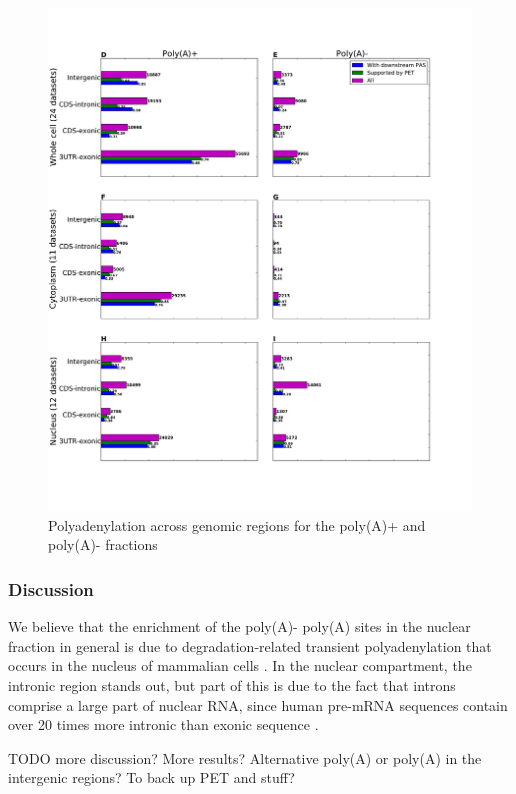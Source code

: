 \begin{figure}[htb]
	\begin{center}
		\includegraphics[scale=0.4]{figures/polyadenylation/Sidebars_pA_2+.pdf}
	\end{center}
	\caption{Polyadenylation across genomic regions for the poly(A)+ and poly(A)-
	fractions}
	\label{fig:sidebars}
\end{figure}

\subsubsection{Discussion}
We believe that the enrichment of the poly(A)- poly(A) sites in the nuclear
fraction in general is due to degradation-related transient polyadenylation
that occurs in the nucleus of mammalian cells \cite{lemay_nuclear_2010,
lacava_rna_2005, wyers_cryptic_2005}. In the nuclear compartment, the intronic
region stands out, but part of this is due to the fact that introns comprise a
large part of nuclear RNA, since human pre-mRNA sequences contain over 20 times
more intronic than exonic sequence \cite{venter_sequence_2001}.

TODO more discussion? More results? Alternative poly(A) or poly(A) in the
intergenic regions? To back up PET and stuff?
